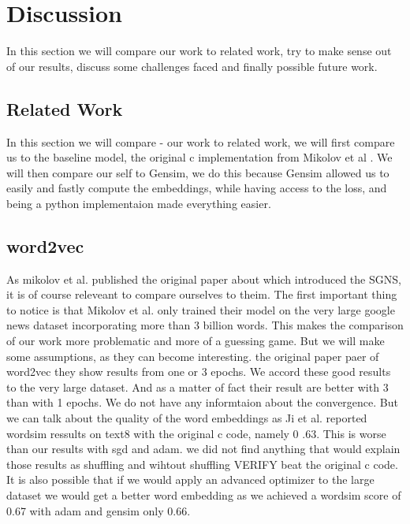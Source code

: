 \chapter{Discussion}\label{chap:discussion}



In this section we will compare our work to related work, try to make sense out of our results, discuss some challenges faced and finally possible future work. 
\section{Related Work}
In this section we will compare - our work to related work, we will first compare us to the baseline model, the original c implementation from Mikolov et al \cite{Mikolov}. We will then compare our self to Gensim, we do this because Gensim allowed us to easily and fastly compute the embeddings, while having access to the loss, and being a python implementaion made everything easier. 

\section{word2vec}

As mikolov et al. published the original paper about which introduced the SGNS, it is of course releveant to compare ourselves to theim. The first important thing to notice is that Mikolov et al. only trained their model on the very large google news dataset incorporating more than 3 billion words. This makes the comparison of our work more problematic and more of a guessing game. But we will make some assumptions, as they can become interesting. 
 the original paper paer of word2vec they show results from one or 3 epochs. We accord these good results to the very large dataset. And as a matter of fact their result are better with 3 than with 1 epochs. We do not have any informtaion about the convergence. But we can talk about the quality of the word embeddings as Ji et al. reported wordsim ressults on text8 with the original c code, namely 0 .63. This is worse than our results with sgd and adam. we did not find anything that would explain those results as shuffling and wihtout shuffling VERIFY beat the original c code. It is also possible that if we would apply an advanced optimizer to the large dataset we would get a better word embedding as we achieved a wordsim score of 0.67 with adam and gensim only 0.66. 


